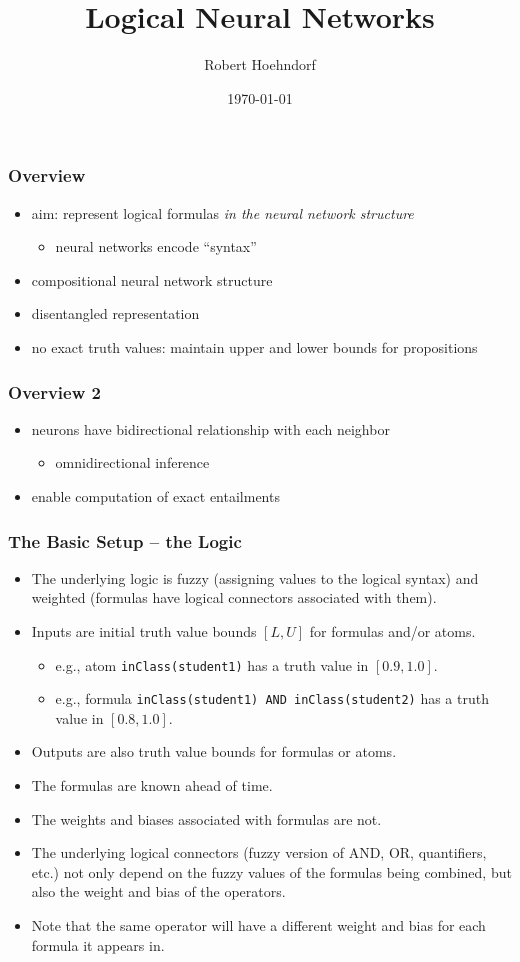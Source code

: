 \documentclass{beamer}
\title{Logical Neural Networks}
\author{Robert Hoehndorf}
\date{\today}
\begin{document}
\frame{\titlepage}

\begin{frame}
\frametitle{Overview}
\begin{itemize}
\item aim: represent logical formulas {\em in the neural network
    structure}
  \begin{itemize}
  \item neural networks encode ``syntax''
  \end{itemize}
\item compositional neural network structure
\item disentangled representation
\item no exact truth values: maintain upper and lower bounds for
  propositions
\end{itemize}
\end{frame}

\begin{frame}
  \frametitle{Overview 2}
  \begin{itemize}
  \item neurons have bidirectional relationship with each neighbor
    \begin{itemize}
    \item omnidirectional inference
    \end{itemize}
  \item enable computation of exact entailments
  \end{itemize}
\end{frame}

\begin{frame}
\frametitle{The Basic Setup -- the Logic}
\begin{itemize}
    \item The underlying logic is fuzzy (assigning values to the
      logical syntax) and weighted (formulas have logical connectors
      associated with them).
    \item Inputs are initial truth value bounds $[L,U]$ for formulas
      and/or atoms.
    \begin{itemize}
        \item e.g., atom \texttt{inClass(student1)} has a truth value
          in $[0.9, 1.0]$.
        \item e.g., formula \texttt{inClass(student1) AND
            inClass(student2)} has a truth value in $[0.8,1.0]$.
    \end{itemize}
    \item Outputs are also truth value bounds for formulas or atoms.
    \item The formulas are known ahead of time.
    \item The weights and biases associated with formulas are not.
    \item The underlying logical connectors (fuzzy version of AND, OR,
      quantifiers, etc.) not only depend on the fuzzy values of the
      formulas being combined, but also the weight and bias of the
      operators.
    \item Note that the same operator will have a different weight and
      bias for each formula it appears in.
\end{itemize}
\end{frame}
\end{document}
